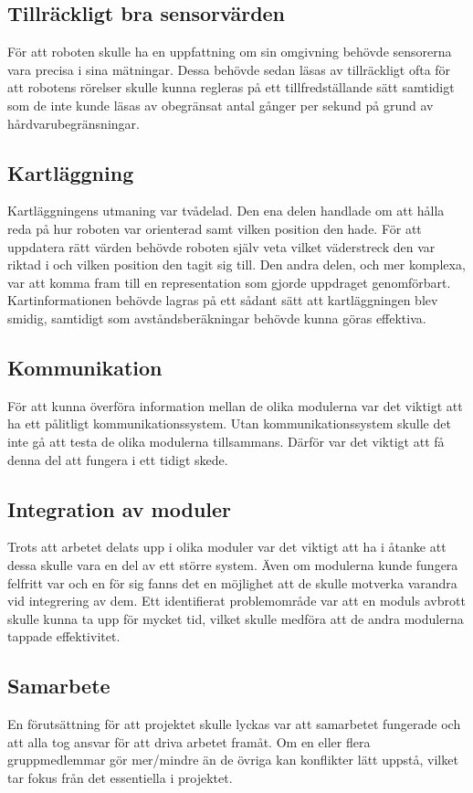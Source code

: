 \documentclass[11pt]{article}
\begin{document}
\begin{flushleft}
\subsection{Tillräckligt bra sensorvärden}
För att roboten skulle ha en uppfattning om sin omgivning behövde sensorerna vara precisa i sina mätningar. Dessa behövde sedan läsas av tillräckligt ofta för att robotens rörelser skulle kunna regleras på ett tillfredställande sätt samtidigt som de inte kunde läsas av obegränsat antal gånger per sekund på grund av hårdvarubegränsningar.

\subsection{Kartläggning}
Kartläggningens utmaning var tvådelad. Den ena delen handlade om att hålla reda på hur roboten var orienterad samt vilken position den hade. För att uppdatera rätt värden behövde roboten själv veta vilket väderstreck den var riktad i och vilken position den tagit sig till. Den andra delen, och mer komplexa, var att komma fram till en representation som gjorde uppdraget genomförbart. Kartinformationen behövde lagras på ett sådant sätt att kartläggningen blev smidig, samtidigt som avståndsberäkningar behövde kunna göras effektiva.

\subsection{Kommunikation}
För att kunna överföra information mellan de olika modulerna var det viktigt att ha ett pålitligt kommunikationssystem. Utan kommunikationssystem skulle det inte gå att testa de olika modulerna tillsammans. Därför var det viktigt att få denna del att fungera i ett tidigt skede.

\subsection{Integration av moduler}
Trots att arbetet delats upp i olika moduler var det viktigt att ha i åtanke att dessa skulle vara en del av ett större system. Även om modulerna kunde fungera felfritt var och en för sig fanns det en möjlighet att de skulle motverka varandra vid integrering av dem. Ett identifierat problemområde var att en moduls avbrott skulle kunna ta upp för mycket tid, vilket skulle medföra att de andra modulerna tappade effektivitet. 

\subsection{Samarbete}
En förutsättning för att projektet skulle lyckas var att samarbetet fungerade och att alla tog ansvar för att driva arbetet framåt. Om en eller flera gruppmedlemmar gör mer/mindre än de övriga kan konflikter lätt uppstå, vilket tar fokus från det essentiella i projektet.



\end{flushleft}
\end{document}
